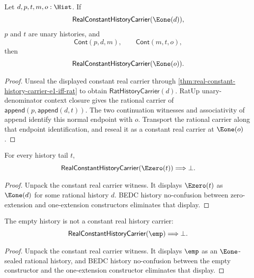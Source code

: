 \begin{theorem}
\label{thm:real-constant-history-carrier-cont-unary-denominator-context-closed}
Let $d,p,t,m,o:\Hist$. If
$$
\mathsf{RealConstantHistoryCarrier}(\Eone(d)),
$$
$p$ and $t$ are unary histories, and
$$
\mathsf{Cont}(p,d,m),\qquad \mathsf{Cont}(m,t,o),
$$
then
$$
\mathsf{RealConstantHistoryCarrier}(\Eone(o)).
$$
\end{theorem}
\begin{proof}
Unseal the displayed constant real carrier through
\autoref{thm:real-constant-history-carrier-e1-iff-rat} to obtain
$\mathsf{RatHistoryCarrier}(d)$. RatUp unary-denominator context closure gives
the rational carrier of $\mathsf{append}(p,\mathsf{append}(d,t))$. The two
continuation witnesses and associativity of append identify this normal
endpoint with $o$. Transport the rational carrier along that endpoint
identification, and reseal it as a constant real carrier at $\Eone(o)$.
\end{proof}

\begin{theorem}
\label{thm:real-constant-history-carrier-e0-absurd}
For every history tail $t$,
$$
\mathsf{RealConstantHistoryCarrier}(\Ezero(t))
\Longrightarrow
\bot.
$$
\end{theorem}
\begin{proof}
Unpack the constant real carrier witness. It displays $\Ezero(t)$ as
$\Eone(d)$ for some rational history $d$. BEDC history no-confusion between
zero-extension and one-extension constructors eliminates that display.
\end{proof}

\begin{theorem}
\label{thm:real-constant-history-carrier-empty-absurd}
The empty history is not a constant real history carrier:
$$
\mathsf{RealConstantHistoryCarrier}(\emp)
\Longrightarrow
\bot.
$$
\end{theorem}
\begin{proof}
Unpack the constant real carrier witness. It displays $\emp$ as an
$\Eone$-sealed rational history, and BEDC history no-confusion between the
empty constructor and the one-extension constructor eliminates that display.
\end{proof}

